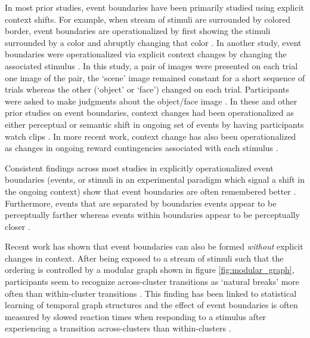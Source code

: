 In most prior studies, event boundaries have been primarily studied using explicit context shifts. For example, when stream of stimuli are surrounded by colored border, event boundaries are operationalized by first showing the stimuli surrounded by a color and abruptly changing that color \parencite{heusser2018perceptual}. In another study, event boundaries were operationalized via explicit context changes by changing the associated stimulus \parencite{ezzyat2014similarity}. In this study, a pair of images were presented on each trial one image of the pair, the `scene' image remained constant for a short sequence of trials whereas the other (`object' or `face') changed on each trial. Participants were asked to make judgments about the object/face image \parencite{ezzyat2014similarity}. In these and other prior studies on event boundaries, context changes had been operationalized as either perceptual or semantic shift in ongoing set of events by having participants watch clips \parencite{swallow2009event}. In more recent work, context change has also been operationalized as changes in ongoing reward contingencies associated with each stimulus \parencite{rouhani2020reward}. 

Consistent findings across most studies in explicitly operationalized event boundaries \ac{(events, or stimuli in an experimental paradigm which signal a shift in the ongoing context)} show that event boundaries are often remembered better \parencite{swallow2009event, radvansky2017event, heusser2018perceptual,clewett2019transcending, rouhani2020reward,ezzyat2014similarity,baldassano2017discovering}. \ac{Furthermore, events that are separated by boundaries events} appear to be perceptually farther whereas events within boundaries appear to be perceptually closer \parencite{clewett2019transcending,ezzyat2014similarity,brunec2018boundaries,lositsky2016neural}. 

Recent work has shown that event boundaries can also be formed \textit{without} explicit changes in context. After being exposed to a stream of stimuli such that the ordering is controlled by a modular graph shown in figure \ref{fig:modular_graph}, participants seem to recognize across-cluster transitions as `natural breaks' more often than within-cluster transitions \parencite{schapiro2013neural}. This finding has been linked to statistical learning of temporal graph structures and the effect of event boundaries is often measured by slowed reaction times when responding to a stimulus after experiencing a transition across-clusters than within-clusters \parencite{karuza2022value,karuza2019human,kahn2018network,kahn2018network,lynn2020abstract,lynn2020human,lynn2020humans}. 

